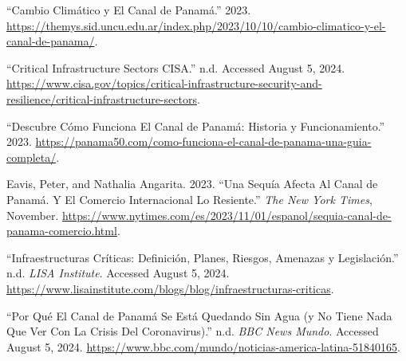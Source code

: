 \documentclass{article}
\newlength{\cslhangindent}
\newlength{\cslentryspacingunit} %
\newenvironment{CSLReferences}[2] %
 {%
  \setlength{\parindent}{0pt}
  \ifodd #1
  \let\oldpar\par
  \def\par{\hangindent=\cslhangindent\oldpar}
  \fi
  \setlength{\parskip}{#2\cslentryspacingunit}
 }%
 {}
\begin{document}
\hypertarget{refs}{}
\begin{CSLReferences}{1}{0}
\leavevmode{}%
{``Cambio Climático y El {Canal} de {Panamá}.''} 2023.
\url{https://themys.sid.uncu.edu.ar/index.php/2023/10/10/cambio-climatico-y-el-canal-de-panama/}.

\leavevmode{}%
{``Critical {Infrastructure} {Sectors} {\textbar} {CISA}.''} n.d.
Accessed August 5, 2024.
\url{https://www.cisa.gov/topics/critical-infrastructure-security-and-resilience/critical-infrastructure-sectors}.

\leavevmode{}%
{``Descubre {Cómo} {Funciona} El {Canal} de {Panamá}: {Historia} y
{Funcionamiento}.''} 2023.
\url{https://panama50.com/como-funciona-el-canal-de-panama-una-guia-completa/}.

\leavevmode{}%
Eavis, Peter, and Nathalia Angarita. 2023. {``Una Sequía Afecta Al
{Canal} de {Panamá}. {Y} El Comercio Internacional Lo Resiente.''}
\emph{The New York Times}, November.
\url{https://www.nytimes.com/es/2023/11/01/espanol/sequia-canal-de-panama-comercio.html}.

\leavevmode{}%
{``Infraestructuras Críticas: Definición, Planes, Riesgos, Amenazas y
Legislación.''} n.d. \emph{LISA Institute}. Accessed August 5, 2024.
\url{https://www.lisainstitute.com/blogs/blog/infraestructuras-criticas}.

\leavevmode{}%
{``Por Qué El {Canal} de {Panamá} Se Está Quedando Sin Agua (y No Tiene
Nada Que Ver Con La Crisis Del Coronavirus).''} n.d. \emph{BBC News
Mundo}. Accessed August 5, 2024.
\url{https://www.bbc.com/mundo/noticias-america-latina-51840165}.

\end{CSLReferences}



\end{document}
